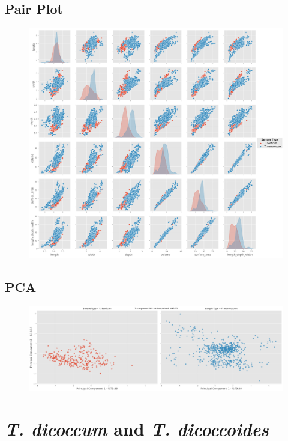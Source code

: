 \documentclass[11pt]{report}
\begin{document}
\subsection{Pair Plot}
\label{sec:orgd859d1a}

\begin{figure}[htbp]
\centering
\includegraphics[width=18cm]{./images/results/group1/pairplot.png}
\label{fig:org04298e6}
\end{figure}

\clearpage
\subsection{PCA}
\label{sec:orgd68409a}
\begin{figure}[htbp]
\centering
\includegraphics[width=18cm]{./images/results/group1/pca.png}
\label{fig:org0e0823a}
\end{figure}

\clearpage
\section{\emph{T. dicoccum} and \emph{T. dicoccoides}}
\label{sec:org7e45b2d}
\end{document}
